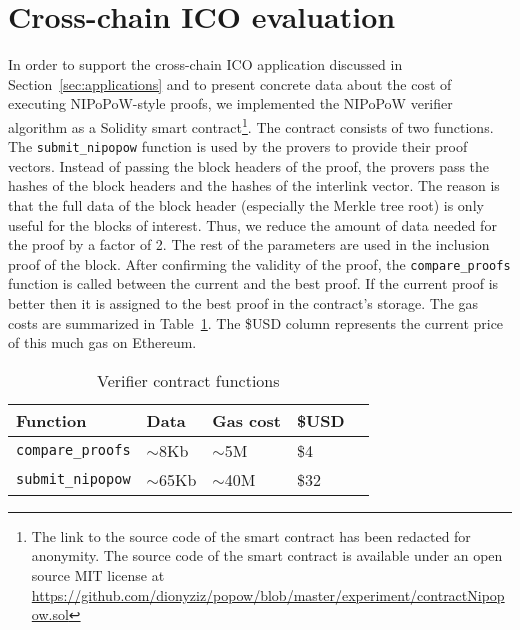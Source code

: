 \section{Cross-chain ICO evaluation}
\label{sec:app-ico}

In order to support the cross-chain ICO application discussed in
Section~\ref{sec:applications} and to present concrete data about the cost of
executing NIPoPoW-style proofs, we implemented the NIPoPoW verifier algorithm as
a Solidity smart contract\footnote{
\ifanonymous
The link to the source code of the smart contract has been redacted for anonymity.
\else
The source code of the smart contract is available under an open source MIT
license at
\url{https://github.com/dionyziz/popow/blob/master/experiment/contractNipopow.sol}
\fi
}.
The contract consists of two functions.
The \texttt{sub\-mit\_ni\-po\-pow} function is used by the provers to provide their
proof vectors. Instead of passing the block headers of the proof, the provers
pass the hashes of the block headers and the hashes of the interlink vector. The
reason is that the full data of the block header (especially the Merkle tree
root) is only useful for the blocks of interest. Thus, we reduce the amount of
data needed for the proof by a factor of 2. The rest of the parameters are used
in the inclusion proof of the block. After confirming the validity of the proof,
the \texttt{compare\_proofs} function is called between the current and the best
proof. If the current proof is better then it is assigned to the best proof in
the contract's storage.
The gas costs are summarized in
Table~\ref{tbl:gascosts}. The \$USD column represents the current price of this
much gas on Ethereum.

\begin{table}[ht]
  \centering
  \caption{Verifier contract functions}
  \label{tbl:gascosts}
  \begin{tabular}{l|l|l|ll}
    \hline
    Function & Data & Gas cost & \$USD \\ \hline
    \texttt{compare\_proofs} & $\sim$8Kb & $\sim$5M & \$4 \\ \hline
    \texttt{submit\_nipopow} & $\sim$65Kb & $\sim$40M & \$32 \\ \hline
  \end{tabular}
\end{table}
